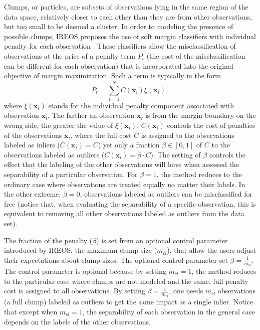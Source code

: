 Clumps, or particles, are subsets of observations lying in the same region of the data space, relatively closer to each other than they are from other observations, but too small to be deemed a cluster. In order to modeling the presence of possible clumps, IREOS proposes the use of soft margin classifiers with individual penalty for each observation \cite{osuna1997}. These classifiers allow the misclassification of observations at the price of a penalty term $P_t$ (the cost of the misclassification can be different for each observation) that is incorporated into the original objective of margin maximization. Such a term is typically in the form
\begin{equation}
P_t = \sum_{i = 1}^{N}C(\mathbf{x}_i)\xi(\mathbf{x}_i), 
\end{equation}
where $\xi(\mathbf{x}_i)$ stands for the individual penalty component associated with observation $\mathbf{x}_i$. The farther an observation $\mathbf{x}_i$ is from the margin boundary on the wrong side, the greater the value of $\xi(\mathbf{x}_i)$. $C(\mathbf{x}_i)$ controls the cost of penalties of the observations $\mathbf{x}_i$, where the full cost $C$ is assigned to the observations labeled as inliers ($C(\mathbf{x}_i) = C$) yet only a fraction $\beta \in [0, 1]$ of $C$ to the observations labeled as outliers ($C(\mathbf{x}_i) = \beta \cdot C$). The setting of $\beta$ controls the effect that the labeling of the other observations will have when assessed the separability of a particular observation. For $\beta = 1$, the method reduces to the ordinary case where observations are treated equally no matter their labels. In the other extreme, $\beta = 0$, observations labeled as outliers can be misclassified for free (notice that, when evaluating the separability of a specific observation, this is equivalent to removing all other observations labeled as outliers from the data set).

The fraction of the penalty ($\beta$) is set from an optional control parameter introduced by IREOS, the maximum clump size ($m_{cl}$), that allow the users adjust their expectations about clump sizes. The optional control parameter set $\beta = \frac{1}{m_{cl}}$. The control parameter is optional because by setting $m_{cl} = 1$, the method reduces to the particular case where clumps are not modeled and the same, full penalty cost is assigned to all observations. By setting $\beta = \frac{1}{m_{cl}}$, one needs $m_{cl}$ observations (a full clump) labeled as outliers to get the same impact as a single inlier. Notice that except when $m_{cl} = 1$, the separability of each observation in the general case depends on the labels of the other observations.

